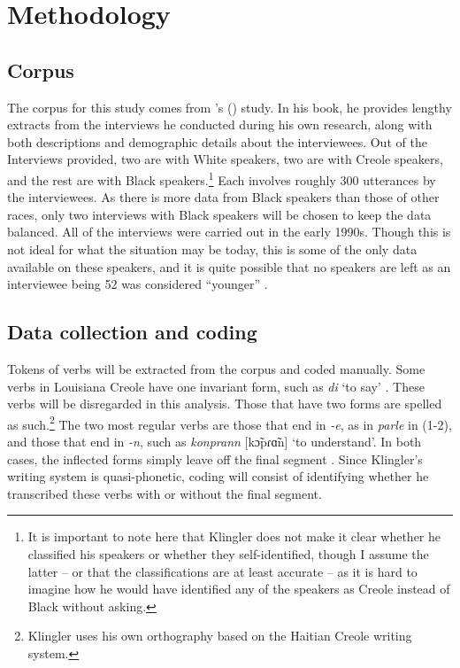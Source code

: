 \documentclass{article}
\newcommand{\lexi}[1]{\textit{#1}}
\newcommand{\gloss}[1]{`#1'}
\begin{document}
  \section{Methodology}
    \subsection{Corpus}
      The corpus for this study comes from \citeauthor{klingler_if_2003}'s (\citeyear{klingler_if_2003}) study.
      In his book, he provides lengthy extracts from the interviews he conducted during his own research, along with both descriptions and demographic details about the interviewees.
      Out of the Interviews provided, two are with White speakers, two are with Creole speakers, and the rest are with Black speakers.\footnote{It is important to note here that Klingler does not make it clear whether he classified his speakers or whether they self-identified, though I assume the latter -- or that the classifications are at least accurate -- as it is hard to imagine how he would have identified any of the speakers as Creole instead of Black without asking.}
      Each involves roughly 300 utterances by the interviewees.
      As there is more data from Black speakers than those of other races, only two interviews with Black speakers will be chosen to keep the data balanced.
      All of the interviews were carried out in the early 1990s.
      Though this is not ideal for what the situation may be today, this is some of the only data available on these speakers, and it is quite possible that no speakers are left as an interviewee being 52 was considered ``younger'' \parencite[p.~381]{klingler_if_2003}.

    \subsection{Data collection and coding}
      Tokens of verbs will be extracted from the corpus and coded manually.
      Some verbs in Louisiana Creole have one invariant form, such as \lexi{di} \gloss{to say} \parencite[p.~247]{klingler_if_2003}.
      These verbs will be disregarded in this analysis.
      Those that have two forms are spelled as such.\footnote{Klingler uses his own orthography based on the Haitian Creole writing system.}
      The two most regular verbs are those that end in \emph{-e}, as in \lexi{parle} in (1-2), and those that end in \emph{-n}, such as \lexi{konprann} [kɔ̃pɾɑ̃n] \gloss{to understand}.
      In both cases, the inflected forms simply leave off the final segment \parencite[p.~244-246]{klingler_if_2003}.
      Since Klingler's writing system is quasi-phonetic, coding will consist of identifying whether he transcribed these verbs with or without the final segment.
\end{document}
